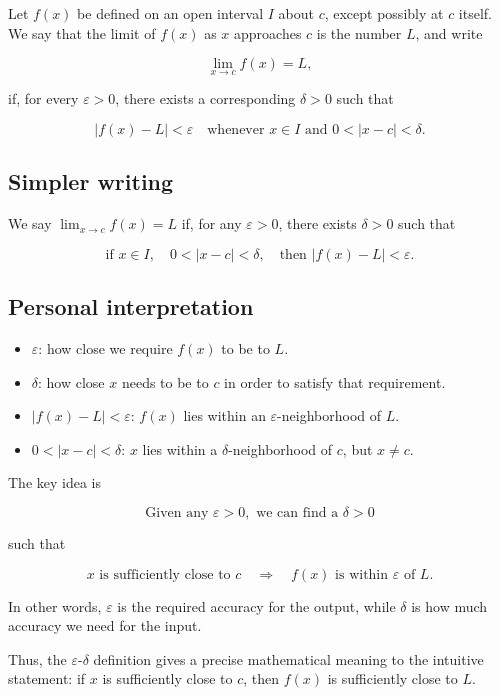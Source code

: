 \documentclass[11pt,a4paper]{article}
\begin{document}
Let \(f(x)\) be defined on an open interval \(I\) about \(c\), except
possibly at \(c\) itself. We say that the limit of \(f(x)\) as \(x\)
approaches \(c\) is the number \(L\), and write

\[
\lim_{x\to c}f(x)=L,
\]

if, for every \(\varepsilon>0\), there exists a corresponding
\(\delta>0\) such that

\[
|f(x)-L|<\varepsilon
\quad\text{whenever }x\in I\text{ and }0<|x-c|<\delta.
\]

\subsection{Simpler writing}\label{simpler-writing}

We say \(\lim_{x\to c}f(x)=L\) if, for any \(\varepsilon>0\), there
exists \(\delta>0\) such that

\[
\text{if }x\in I,\quad 0<|x-c|<\delta,
\quad\text{then }|f(x)-L|<\varepsilon.
\]

\subsection{Personal interpretation}\label{personal-interpretation}

\begin{itemize}
\item
  \(\varepsilon\): how close we require \(f(x)\) to be to \(L\).
\item
  \(\delta\): how close \(x\) needs to be to \(c\) in order to satisfy
  that requirement.
\item
  \(|f(x)-L|<\varepsilon\): \(f(x)\) lies within an
  \(\varepsilon\)-neighborhood of \(L\).
\item
  \(0<|x-c|<\delta\): \(x\) lies within a \(\delta\)-neighborhood of
  \(c\), but \(x\ne c\).
\end{itemize}

The key idea is

\[
\boxed{\text{Given any }\varepsilon>0,\text{ we can find a }\delta>0}
\]

such that

\[
x\text{ is sufficiently close to }c
\quad\Longrightarrow\quad
f(x)\text{ is within }\varepsilon\text{ of }L.
\]

In other words, \(\varepsilon\) is the required accuracy for the output,
while \(\delta\) is how much accuracy we need for the input.

Thus, the \(\varepsilon\)-\(\delta\) definition gives a precise
mathematical meaning to the intuitive statement: if \(x\) is
sufficiently close to \(c\), then \(f(x)\) is sufficiently close to
\(L\).
\end{document}
